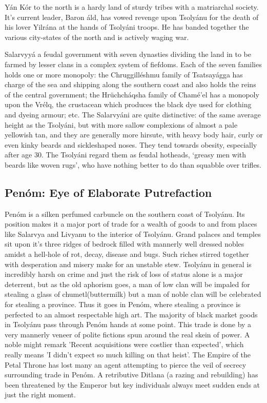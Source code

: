 Yán Kór to the north is a hardy land of sturdy tribes with a matriarchal society. It's current leader, Baron áld, has vowed revenge upon Tsolyánu for the death of his lover Yilrána at the hands of Tsolyáni troops. He has banded together the various city-states of the north and is actively waging war. 

Salarvyyá a feudal government with seven dynasties dividing the land in to be farmed by lesser clans in a complex system of fiefdoms. Each of the seven families holds one or more monopoly: the Chruggilléshmu family of Tsatsayágga has charge of the sea and shipping along the southern coast and also holds the reins of the central government; the Hrüchcháqsha family of Chamé’el has a monopoly upon the Vrélq, the crustacean which produces the black dye used for clothing and dyeing armour; etc. The Salarvyáni are quite distinctive: of the same average height as the Tsolyáni, but with more sallow complexions of almost a pale yellowish tan, and they are generally more hirsute, with heavy body hair, curly or even kinky beards and sickleshaped noses. They tend towards obesity, especially after age 30. The Tsolyáni regard them as feudal hotheads, `greasy men with beards like woven rugs’, who have nothing better to do than squabble over trifles.


\subsection{Penóm: Eye of Elaborate Putrefaction}

Penóm is a silken perfumed carbuncle on the southern coast of Tsolyánu. Its position makes it a  major port of trade for a wealth of goods to and from places like Salarvya and Livyanu to the interior of Tsolyánu. Grand palaces and temples sit upon it's three ridges of bedrock filled with mannerly well dressed nobles amidst a hell-hole of rot, decay, disease and bugs. Such riches stirred together with desperation and misery make for an unstable stew. Tsolyánu in general is incredibly harsh on crime and just the risk of loss of status alone is a major deterrent, but as the old aphorism goes, a man of low clan will be impaled for stealing a glass of chumetl(buttermilk) but a man of noble clan will be celebrated for stealing a province. Thus it goes in Penóm, where stealing a province is perfected to an almost respectable high art. The majority of black market goods in Tsolyánu pass through Penóm hands at some point. This trade is done by a very mannerly veneer of polite fictions spun around the real skein of power. A noble might remark 'Recent acquisitions were costlier than expected', which really means 'I didn't expect so much killing on that heist'. The Empire of the Petal Throne has lost many an agent attempting to pierce the veil of secrecy surrounding trade in Penóm. A retributive Ditlana (a razing and rebuilding) has been threatened by the Emperor but key individuals always meet sudden ends at just the right moment.

